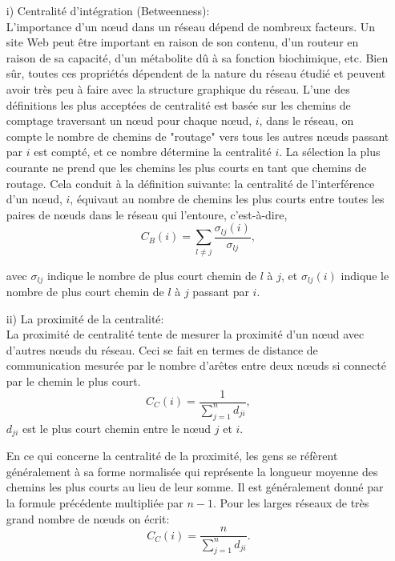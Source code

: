 \begin{itemize}
 \item[i)] Centralité d'intégration (Betweenness):\\
  L'importance d'un nœud dans un réseau dépend de nombreux facteurs. Un site Web peut être important en raison de son contenu, d'un routeur en raison de sa capacité, d'un métabolite dû à sa fonction biochimique, etc. Bien sûr, toutes ces propriétés dépendent de la nature du réseau étudié et peuvent avoir très peu à faire avec la structure graphique du réseau. L'une des définitions les plus acceptées de centralité est basée sur les chemins de comptage traversant un nœud pour chaque nœud, $i$, dans le réseau, on compte le nombre de chemins de "routage" vers tous les autres nœuds passant par $i$ est compté, et ce nombre détermine la centralité $i$. La sélection la plus courante ne prend que les chemins les plus courts en tant que chemins de routage. Cela conduit à la définition suivante: la centralité de l'interférence d'un nœud, $i$, équivaut au nombre de chemins les plus courts entre toutes les paires de nœuds dans le réseau qui l'entoure, c'est-à-dire,
 \begin{equation}
 C_B(i)=\sum_{l\neq j}\dfrac{\sigma_{lj}(i)}{\sigma_{lj}},
 \end{equation}
 
 avec $\sigma_{lj}$ indique le nombre de plus court chemin de $l$ à $j$, et $\sigma_{lj}(i)$ indique le nombre de plus court chemin de $l$ à $j$ passant par $i$.

\item[ii)] La proximité de la centralité:\\
La proximité de centralité tente de mesurer la proximité d'un nœud avec d'autres nœuds du réseau. Ceci se fait en termes de distance de communication mesurée par le nombre d'arêtes entre deux nœuds si connecté par le chemin le plus court.
\begin{equation}
C_C(i)=\dfrac{1}{\sum_{j=1}^nd_{ji}},
\end{equation}
$d_{ji}$ est le plus court chemin entre le nœud $j$ et $i$.

En ce qui concerne la centralité de la proximité, les gens se réfèrent généralement à sa forme normalisée qui représente la longueur moyenne des chemins les plus courts au lieu de leur somme. Il est généralement donné par la formule précédente multipliée par $n-1$. Pour les larges réseaux de très grand nombre de nœuds on écrit:
\begin{equation}
C_C(i)=\dfrac{n}{\sum_{j=1}^nd_{ji}}.
\end{equation}
\end{itemize}
